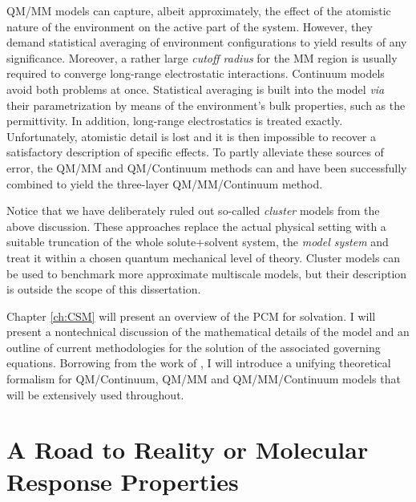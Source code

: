 \acrshort{QM}/\acrshort{MM} models can capture, albeit approximately, the effect
of the atomistic nature of the environment on the active part of the
system.
However, they demand statistical averaging of environment configurations
to yield results of any significance. Moreover, a rather large
\emph{cutoff radius} for the \acrshort{MM} region is usually required to converge
long-range electrostatic interactions.\autocite{Steindal2011-ki}
Continuum models avoid both problems at once. Statistical averaging is
built into the model \emph{via} their parametrization by
means of the environment's bulk properties, such as the permittivity.
In addition, long-range electrostatics is treated exactly.
Unfortunately, atomistic detail is lost and it is then impossible to
recover a satisfactory description of specific effects.
To partly alleviate these sources of error, the
\acrshort{QM}/\acrshort{MM} and \acrshort{QM}/Continuum methods can and
have been successfully combined to yield the three-layer
\acrshort{QM}/\acrshort{MM}/Continuum method.\autocite{Steindal2011-ki,
Lipparini2011-rd, Caprasecca2012-ir, Lipparini2013-ud}

Notice that we have deliberately ruled out so-called \emph{cluster}
models from the above discussion.
These approaches replace the actual physical setting with a suitable
truncation of the whole solute+solvent system, the \emph{model system}
and treat it within a chosen quantum mechanical level of theory.
Cluster models can be used to benchmark more approximate multiscale
models, but their description is outside the scope of this dissertation.

Chapter \ref{ch:CSM} will present an overview of the \gls{PCM} for
solvation.
I will present a nontechnical discussion of the mathematical details of
the model and an outline of current methodologies for the solution of
the associated governing equations.
Borrowing from the work of \citeauthor{Lipparini2010-be},\autocite{Lipparini2010-be,
Lipparini2015-lq} I will introduce a unifying theoretical formalism for
\acrshort{QM}/Continuum, \acrshort{QM}/\acrshort{MM} and \acrshort{QM}/\acrshort{MM}/Continuum models that will
be extensively used throughout.

\section*{A Road to Reality or Molecular Response Properties}

